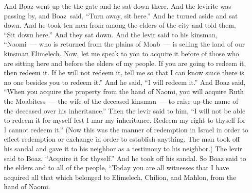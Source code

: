 
\begin{inparaenum}
   And Boaz went up the the gate and he sat down there. And the levirite was passing by, and Boaz\understood{}\ said, ``Turn away, sit here.'' And he turned aside and sat down.%
   And he took ten men from among the elders of the city and told them, ``Sit down here.'' And they sat down.%
   And the levir said to his kinsman, ``Naomi~--- who is returned from the plains of Moab~--- is selling the land of our kinsman Elimelech.%
   Now, let me speak to you to acquire it before of those who are sitting here and before the elders of my people. If you are going to redeem it, then redeem it. If he will not redeem it, tell me so that I can know since there is no one besides you to redeem it.'' And he said, ``I will redeem it.''%
   And Boaz said, ``When you acquire the property from the hand of Naomi, you will acquire Ruth the Moabitess~--- the wife of the deceased kinsman~--- to raise up the name of the deceased over his inheritance.''%
   Then the levir said to him, ``I will not be able to redeem it for myself lest I mar my inheritance. Redeem my right to thyself for I cannot redeem it.''%
   (Now this was the manner of redemption in Israel in order to effect redemption or exchange in order to establish anything. The man took off his sandal and gave it to his neighbor as a testimony to his neighbor.)%
   The levir said to Boaz, ``Acquire it for thyself.'' And he took off his sandal.%
   So Boaz said to the elders and to all of the people, ``Today you are all witnesses that I have acquired all that which belonged to Elimelech, Chilion, and Mahlon, from the hand of Naomi.%

\end{inparaenum}
